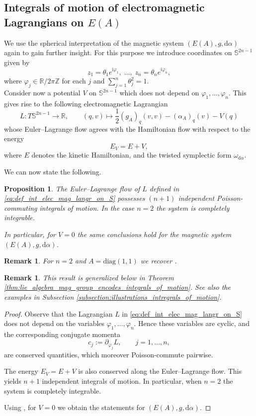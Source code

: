 \documentclass[11pt,reqno]{amsart}
\newcommand{\IR}{{\mathbb R}}%
\theoremstyle{plain}
\newtheorem{prop}[thm]{Proposition}
\newtheorem{rem}[thm]{Remark}
\theoremstyle{definition}
\numberwithin{equation}{section}
\def\a{\alpha}
\def\d{\delta}
\def\a{\alpha}
\def\d{\delta}
\def\RR{{\mathbb R}}
\def\ZZ{{\mathbb Z}}
\def\d{{\mathrm{d}}}
\def\S{{\mathbb{S}^{2n-1}}}
\def\i{{\mathrm{i}}}
\begin{document}
\subsection{Integrals of motion of electromagnetic Lagrangians on $E(A)$}\label{ss:Integrals of motion of electromagentic Lagrangians}
We use the spherical interpretation of the magnetic system $(E(A), g, \d\alpha)$ again to gain further insight. For this purpose we introduce coordinates on $\S$ given by
\[
z_1=\theta_1 e^{\i \varphi_1},\; \ldots ,\; z_n=\theta_n e^{\i \varphi_n},
\]
where $\varphi_j\in \IR/2\pi \ZZ$ for each $j$ and $\sum_{j=1}^n \theta_j^2=1$. \\

Consider now a potential $V$ on $\S$ which does not depend on $\varphi_1,\ldots,\varphi_n$. This gives rise to the following electromagnetic Lagrangian
\begin{equation}\label{eq:def_int_elec_mag_langr_on_S}
L:T\S \longrightarrow \RR, 
\qquad 
(q,v)\mapsto \frac12 (g_A)_q(v,v)-(\alpha_A)_q(v)-V(q)
\end{equation}
whose Euler--Lagrange flow agrees with the Hamiltonian flow with respect to the energy
\[
E_V = E+ V ,
\]
where $E$ denotes the kinetic Hamiltonian, and the twisted symplectic form $\omega_{\d \alpha}$.

We can now state the following.

\begin{prop}\label{Prop:intergrals of motion of electromagnetic ELE on ellipsoid}
The Euler--Lagrange flow of $L$ defined in \eqref{eq:def_int_elec_mag_langr_on_S} possesses $(n+1)$ independent Poisson-commuting integrals of motion. In the case $n=2$ the system is completely integrable. 

In particular, for $V=0$ the same conclusions hold for the magnetic system $(E(A), g, \d\alpha)$.
\end{prop}

\begin{rem}
For $n=2$ and $A=\mathrm{diag}(1,1)$ we recover \cite[Cor.~A.1]{BM24}.
\end{rem}

\begin{rem}
This result is generalized below in Theorem \ref{thm:lie_algebra_mag_group_encodes_integrals_of_motion}. See also the examples in Subsection \ref{subsection:illustrations_intregrals_of_motion}.
\end{rem}

\begin{proof}
Observe that the Lagrangian $L$ in \eqref{eq:def_int_elec_mag_langr_on_S} does not depend on the variables $\varphi_1,\ldots,\varphi_n$. Hence these variables are cyclic, and the corresponding conjugate momenta
\[
c_j := \partial_{\dot{\varphi}_j} L, \qquad j=1,\ldots,n,
\]
are conserved quantities, which moreover Poisson-commute pairwise.

The energy $E_V = E+ V$ is also conserved along the Euler--Lagrange flow. This yields $n+1$ independent integrals of motion. In particular, when $n=2$ the system is completely integrable.

Using , for $V=0$ we obtain the statements for $(E(A),g,\d\a)$.
\end{proof}
\end{document}
